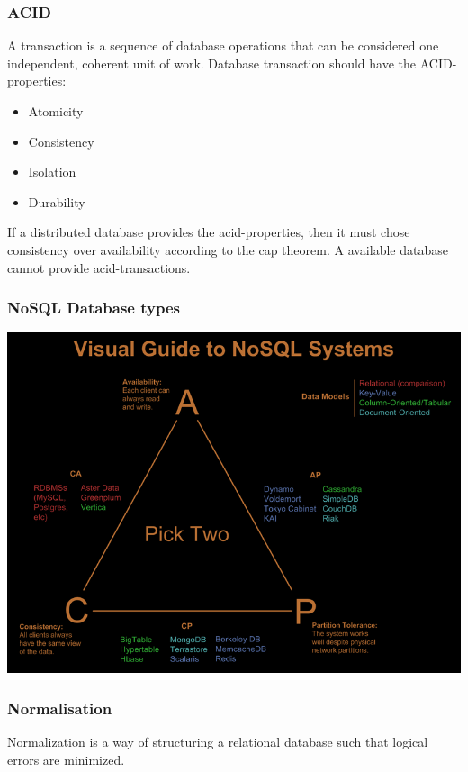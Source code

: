 \subsubsection{ACID}
A transaction is a sequence of database operations that can be considered one independent, coherent unit of work. Database transaction should have the ACID-properties:
\begin{itemize}
    \item Atomicity
    \item Consistency
    \item Isolation
    \item Durability
\end{itemize}

If a distributed database provides the acid-properties, then it must chose consistency over availability according to the cap theorem. A available database cannot provide acid-transactions. 

\subsubsection{NoSQL Database types}
\includegraphics[scale=0.5]{images/cap_choice.png}


\subsubsection{Normalisation}
Normalization is a way of structuring a relational database such that logical errors are minimized. 

